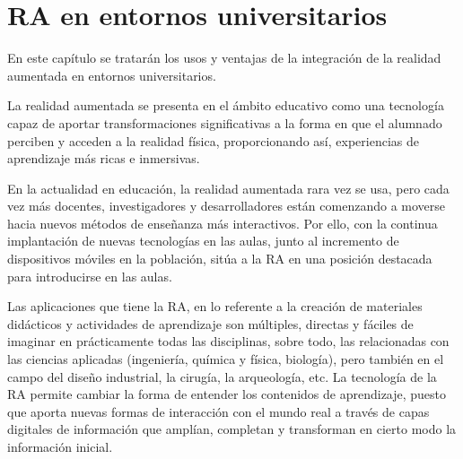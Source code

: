 %
%
%
%

\chapter{RA en entornos universitarios } \label{chap:RAEntornosUniversitarios}  

En este capítulo se tratarán los usos y ventajas de la integración de la realidad aumentada en entornos universitarios.

La realidad aumentada se presenta en el ámbito educativo como una tecnología capaz de aportar transformaciones significativas a la forma en que el alumnado perciben y acceden a la realidad física, proporcionando así, experiencias de aprendizaje más ricas e inmersivas.

En la actualidad en educación, la realidad aumentada rara vez se usa, pero cada vez más docentes, investigadores y desarrolladores están comenzando a moverse hacia nuevos métodos de enseñanza más interactivos. Por ello, con la continua implantación de nuevas tecnologías en las aulas, junto al incremento de dispositivos móviles en la población, sitúa a la RA en una posición destacada para introducirse en las aulas. 

Las aplicaciones que tiene la RA, en lo referente a la creación de materiales didácticos y actividades de aprendizaje son múltiples, directas y fáciles de imaginar en prácticamente todas las disciplinas, sobre todo, las relacionadas con las ciencias aplicadas (ingeniería, química y física, biología), pero también en el campo del diseño industrial, la cirugía, la arqueología, etc.
La tecnología de la RA permite cambiar la forma de entender los contenidos de aprendizaje, puesto que aporta nuevas formas de interacción con el mundo real a través de capas digitales de información que amplían, completan y transforman en cierto modo la información inicial.

